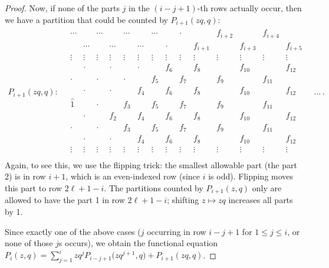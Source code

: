 \documentclass[10pt,a4paper]{amsart}
\numberwithin{equation}{section}
\theoremstyle{definition}
\newcommand{\ficone}{{\widehat{1}}}
\begin{document}
\begin{proof}
Now, if none of the parts $j$ in the $(i-j+1)$-th rows actually occur, then we have a partition that could be counted by $P_{i+1}(zq,q)$:
\begin{gather*}
P_{i+1}(zq,q)\colon \quad
\begin{matrix}
\!\cdots\! && \!\cdots\! && \!\cdots\! && \!\cdots\! && \cdot && f_{i+2} && f_{i+4} & \\
& \!\cdots\! && \!\cdots\! && \!\cdots\! && \cdot && f_{i+1} && f_{i+3} && f_{i+5}\\
\vdots & \vdots &\vdots& \vdots &\vdots& \vdots &\vdots& \vdots &\vdots& \vdots &\vdots& \vdots&\vdots& \vdots\\
& \cdot && \cdot && \cdot && f_6 && f_8 && f_{10} && f_{12}\\
\cdot &&\cdot && \cdot && f_5 && f_7 && f_9 && f_{11} & \\
& \cdot && \cdot && f_4 && f_6 && f_8 && f_{10} && f_{12}\\
\ficone &&\cdot && f_3 && f_5 && f_7 && f_9 && f_{11} & \\
& \cdot && f_2 && f_4 && f_6 && f_8 && f_{10} && f_{12}\\
\cdot &&\cdot && f_3 && f_5 && f_7 && f_9 && f_{11} & \\
& \cdot && \cdot && f_4 && f_6 && f_8 && f_{10} && f_{12}\\
\vdots & \vdots &\vdots& \vdots &\vdots& \vdots &\vdots& \vdots &\vdots& \vdots &\vdots& \vdots&\vdots& \vdots\\
 \end{matrix}\quad \dots\,.
\end{gather*}
Again, to see this, we use the flipping trick: the smallest allowable part (the part 2) is in row $i+1$, which is an even-indexed row (since $i$ is odd). Flipping moves this part to row $2\ell+1-i$. The partitions counted by $P_{i+1}(z,q)$ only are allowed to have the part 1 in row $2\ell+1-i$; shifting $z\mapsto zq$ increases all parts by 1.

Since exactly one of the above cases ($j$ occurring in row $i-j+1$ for $1 \le j \le i$, or none of those $j$s occurs), we obtain the functional equation $P_i(z,q) = \sum_{j=1}^i zq^j P_{i-j+1}\bigl(zq^{j+1},q\bigr)+ P_{i+1}(zq,q)$.


\end{proof}
\end{document}
